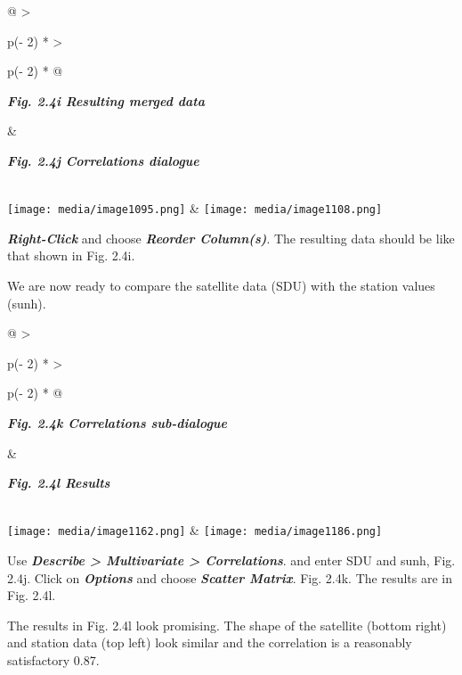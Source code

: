\documentclass[
  letterpaper,
  DIV=11,
  numbers=noendperiod]{scrreprt}
\begin{document}
\begin{longtable}[]{@{}
  >{\raggedright\arraybackslash}p{(\columnwidth - 2\tabcolsep) * }
  >{\raggedright\arraybackslash}p{(\columnwidth - 2\tabcolsep) * }@{}}
\toprule\noalign{}
\begin{minipage}[b]{\linewidth}\raggedright
\textbf{\emph{Fig. 2.4i Resulting merged data}}
\end{minipage} & \begin{minipage}[b]{\linewidth}\raggedright
\textbf{\emph{Fig. 2.4j Correlations dialogue}}
\end{minipage} \\
\midrule\noalign{}
\endhead
\bottomrule\noalign{}
\endlastfoot
\texttt{[image: media/image1095.png]} &
\texttt{[image: media/image1108.png]} \\
\end{longtable}

\textbf{\emph{Right-Click}} and choose \textbf{\emph{Reorder
Column(s)}}. The resulting data should be like that shown in Fig. 2.4i.

We are now ready to compare the satellite data (SDU) with the station
values (sunh).

\begin{longtable}[]{@{}
  >{\raggedright\arraybackslash}p{(\columnwidth - 2\tabcolsep) * }
  >{\raggedright\arraybackslash}p{(\columnwidth - 2\tabcolsep) * }@{}}
\toprule\noalign{}
\begin{minipage}[b]{\linewidth}\raggedright
\textbf{\emph{Fig. 2.4k Correlations sub-dialogue}}
\end{minipage} & \begin{minipage}[b]{\linewidth}\raggedright
\textbf{\emph{Fig. 2.4l Results}}
\end{minipage} \\
\midrule\noalign{}
\endhead
\bottomrule\noalign{}
\endlastfoot
\texttt{[image: media/image1162.png]} &
\texttt{[image: media/image1186.png]} \\
\end{longtable}

Use \textbf{\emph{Describe \textgreater{} Multivariate \textgreater{}
Correlations}}. and enter SDU and sunh, Fig. 2.4j. Click on
\textbf{\emph{Options}} and choose \textbf{\emph{Scatter Matrix}}. Fig.
2.4k. The results are in Fig. 2.4l.

The results in Fig. 2.4l look promising. The shape of the satellite
(bottom right) and station data (top left) look similar and the
correlation is a reasonably satisfactory 0.87.
\end{document}
